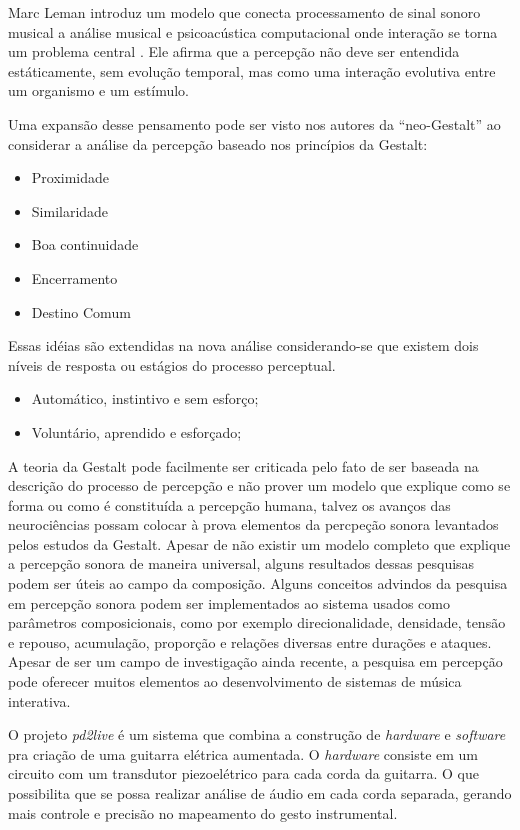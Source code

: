\documentclass{ppgmus}
\begin{document}
Marc Leman introduz um modelo que conecta processamento de 
sinal sonoro musical a análise musical e psicoacústica computacional onde interação
se torna um problema central \cite{leman96:gestalt}. Ele afirma que a percepção não deve ser entendida estáticamente,
sem evolução temporal, mas como uma interação evolutiva entre um organismo e um estímulo.

Uma expansão desse pensamento pode ser visto nos autores da ``neo-Gestalt'' ao considerar
a análise da percepção baseado nos princípios da Gestalt:
\begin{itemize}
 \item Proximidade
  \item Similaridade
  \item Boa continuidade
  \item Encerramento
  \item Destino Comum
\end{itemize}
Essas idéias são extendidas na nova análise considerando-se que existem dois níveis de
resposta ou estágios do processo perceptual.
\begin{itemize}
 \item Automático, instintivo e sem esforço;
  \item Voluntário, aprendido e esforçado;
\end{itemize}



A teoria da Gestalt pode facilmente ser criticada pelo fato de ser baseada na descrição
do processo de percepção e não prover um modelo que explique como se forma ou como é constituída 
a percepção humana, talvez os avanços das neurociências possam colocar à prova elementos
da percpeção sonora levantados pelos estudos da Gestalt.
Apesar de não existir um modelo completo que explique a percepção sonora
de maneira universal, alguns resultados dessas pesquisas podem ser úteis 
ao campo da composição.
Alguns conceitos advindos da pesquisa em percepção sonora podem ser implementados ao sistema usados como
parâmetros composicionais, como por exemplo direcionalidade, densidade, tensão
e repouso, acumulação, proporção e relações diversas entre durações e ataques.
Apesar de ser um campo de investigação ainda recente, a pesquisa em percepção pode oferecer muitos elementos ao 
desenvolvimento de sistemas de música interativa.


O projeto \textit{pd2live} \cite{rickgrahan} é um sistema que combina a construção de \textit{hardware}
e \textit{software} pra criação de uma guitarra elétrica aumentada. O \textit{hardware} consiste
em um circuito com um transdutor piezoelétrico para cada corda da guitarra. O que possibilita que 
se possa realizar análise de áudio em cada corda separada, gerando mais controle e precisão
no mapeamento do gesto instrumental.
\end{document}
